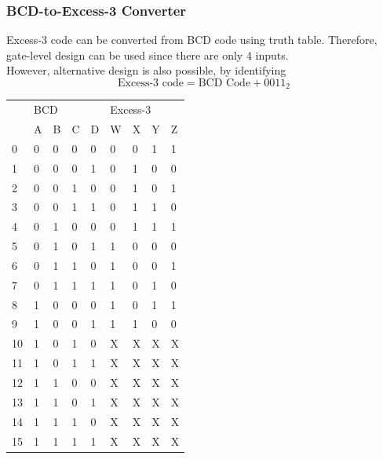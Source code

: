 \documentclass[12pt]{article}
\theoremstyle{definition}
\begin{document}
\subsubsection{BCD-to-Excess-3 Converter}
Excess-3 code can be converted from BCD code using truth table. Therefore, gate-level design can be used since there are only 4 inputs. \\
However, alternative design is also possible, by identifying
\[
\text{Excess-}3\text{ code} = \text{BCD Code}+ 0011_2
\]
\clearpage
\begin{table}[h]
\centering
\begin{tabular}{|l|l|l|l|l|l|l|l|l|}
\hline
\multirow{2}{*}{} & \multicolumn{4}{l|}{BCD} & \multicolumn{4}{l|}{Excess-3} \\ \cline{2-9} 
                  & A    & B    & C    & D   & W     & X     & Y     & Z     \\ \hline
0                 & 0    & 0    & 0    & 0   & 0     & 0     & 1     & 1     \\ \hline
1                 & 0    & 0    & 0    & 1   & 0     & 1     & 0     & 0     \\ \hline
2                 & 0    & 0    & 1    & 0   & 0     & 1     & 0     & 1     \\ \hline
3                 & 0    & 0    & 1    & 1   & 0     & 1     & 1     & 0     \\ \hline
4                 & 0    & 1    & 0    & 0   & 0     & 1     & 1     & 1     \\ \hline
5                 & 0    & 1    & 0    & 1   & 1     & 0     & 0     & 0     \\ \hline
6                 & 0    & 1    & 1    & 0   & 1     & 0     & 0     & 1     \\ \hline
7                 & 0    & 1    & 1    & 1   & 1     & 0     & 1     & 0     \\ \hline
8                 & 1    & 0    & 0    & 0   & 1     & 0     & 1     & 1     \\ \hline
9                 & 1    & 0    & 0    & 1   & 1     & 1     & 0     & 0     \\ \hline
10                & 1    & 0    & 1    & 0   & X     & X     & X     & X     \\ \hline
11                & 1    & 0    & 1    & 1   & X     & X     & X     & X     \\ \hline
12                & 1    & 1    & 0    & 0   & X     & X     & X     & X     \\ \hline
13                & 1    & 1    & 0    & 1   & X     & X     & X     & X     \\ \hline
14                & 1    & 1    & 1    & 0   & X     & X     & X     & X     \\ \hline
15                & 1    & 1    & 1    & 1   & X     & X     & X     & X     \\ \hline
\end{tabular}
\end{table}
\end{document}
